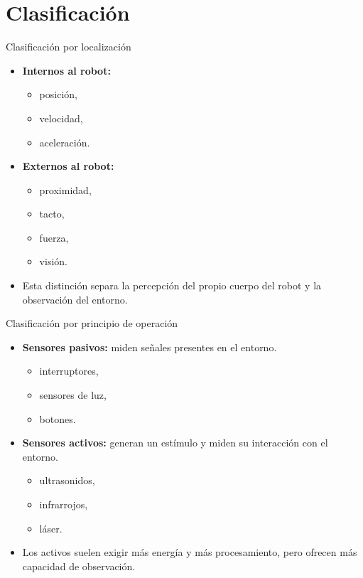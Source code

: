 \documentclass[aspectratio=169]{beamer}
\begin{document}
\section{Clasificación}

\begin{frame}{Clasificación por localización}
\small
\begin{itemize}
  \item \textbf{Internos al robot:}
  \begin{itemize}
    \item posición,
    \item velocidad,
    \item aceleración.
  \end{itemize}
  \item \textbf{Externos al robot:}
  \begin{itemize}
    \item proximidad,
    \item tacto,
    \item fuerza,
    \item visión.
  \end{itemize}
  \item Esta distinción separa la percepción del propio cuerpo del robot y la observación del entorno.
\end{itemize}
\end{frame}

\begin{frame}{Clasificación por principio de operación}
\small
\begin{itemize}
  \item \textbf{Sensores pasivos:} miden señales presentes en el entorno.
  \begin{itemize}
    \item interruptores,
    \item sensores de luz,
    \item botones.
  \end{itemize}
  \item \textbf{Sensores activos:} generan un estímulo y miden su interacción con el entorno.
  \begin{itemize}
    \item ultrasonidos,
    \item infrarrojos,
    \item láser.
  \end{itemize}
  \item Los activos suelen exigir más energía y más procesamiento, pero ofrecen más capacidad de observación.
\end{itemize}
\end{frame}
\end{document}
